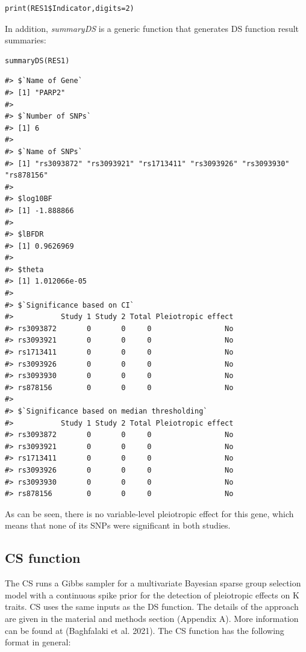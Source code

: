 \begin{verbatim}
print(RES1$Indicator,digits=2)
\end{verbatim}

In addition, \emph{summaryDS} is a generic function that generates DS function result summaries:

\begin{verbatim}
summaryDS(RES1)
\end{verbatim}

\begin{verbatim}
#> $`Name of Gene`
#> [1] "PARP2"
#> 
#> $`Number of SNPs`
#> [1] 6
#> 
#> $`Name of SNPs`
#> [1] "rs3093872" "rs3093921" "rs1713411" "rs3093926" "rs3093930" "rs878156" 
#> 
#> $log10BF
#> [1] -1.888866
#> 
#> $lBFDR
#> [1] 0.9626969
#> 
#> $theta
#> [1] 1.012066e-05
#> 
#> $`Significance based on CI`
#>           Study 1 Study 2 Total Pleiotropic effect
#> rs3093872       0       0     0                 No
#> rs3093921       0       0     0                 No
#> rs1713411       0       0     0                 No
#> rs3093926       0       0     0                 No
#> rs3093930       0       0     0                 No
#> rs878156        0       0     0                 No
#> 
#> $`Significance based on median thresholding`
#>           Study 1 Study 2 Total Pleiotropic effect
#> rs3093872       0       0     0                 No
#> rs3093921       0       0     0                 No
#> rs1713411       0       0     0                 No
#> rs3093926       0       0     0                 No
#> rs3093930       0       0     0                 No
#> rs878156        0       0     0                 No
\end{verbatim}

As can be seen, there is no variable-level pleiotropic effect for this gene, which means that none of its SNPs were significant in both studies.

\hypertarget{cs-function}{%
\subsection{CS function}\label{cs-function}}

The CS runs a Gibbs sampler for a multivariate Bayesian sparse group selection model with a continuous spike prior for the detection of pleiotropic effects on K traits. CS uses the same inputs as the DS function.
The details of the approach are given in the material and methods section (Appendix A). More information can be found at (Baghfalaki et al. 2021).
The CS function has the following format in general:

